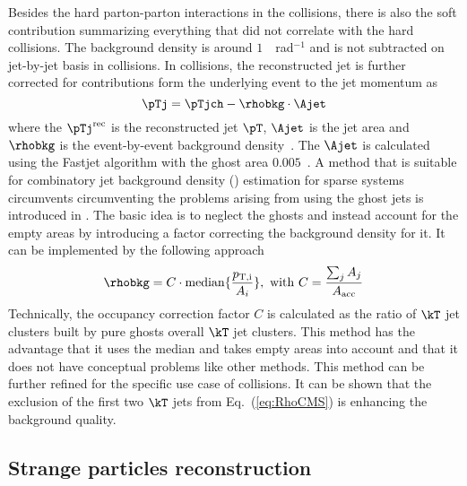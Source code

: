 \documentclass[ALICE,manyauthors]{cernphprep}
\begin{document}
Besides the hard parton-parton interactions in the collisions, there is also the soft contribution summarizing everything that did not correlate with the hard collisions.
The background density is around $1$~\GeVc~rad$^{-1}$ and is not subtracted on jet-by-jet basis in \pp collisions.
In \pPb collisions, the reconstructed jet is further corrected for contributions form the underlying event to the jet momentum as
\begin{equation}
\pTj = \pTjch - \rhobkg\cdot\Ajet
\label{eq:DeltaPt}
\end{equation}
where the $\pTj^{\rm rec}$ is the reconstructed jet $\pT$, $\Ajet$ is the jet area and $\rhobkg$ is the event-by-event background density~\cite{Cacciari:2007fd}.
The $\Ajet$ is calculated using the Fastjet algorithm with the ghost area $0.005$~\cite{Cacciari:2008gn}.
A method that is suitable for combinatory jet background density (\rhobkg) estimation for sparse systems circumvents circumventing the problems arising from using the ghost jets is introduced in \cite{Chatrchyan:2012tt}.
The basic idea is to neglect the ghosts and instead account for the empty areas by introducing a factor correcting the background density for it.
It can be implemented by the following approach
\begin{equation}
\rhobkg = C\cdot{\rm median}\{\frac{p_{\rm T,i}}{A_{i}}\},~{\rm with}~C = \frac{\sum_{j} A_{j}}{A_\mathrm{acc}}
\label{eq:RhoCMS}
\end{equation}
Technically, the occupancy correction factor $C$ is calculated as the ratio of $\kT$ jet clusters built by pure ghosts overall $\kT$ jet clusters.
This method has the advantage that it uses the median and takes empty areas into account and that it does not have conceptual problems like other methods.
This method can be further refined for the specific use case of \pPb collisions.
It can be shown that the exclusion of the first two $\kT$ jets from Eq.~(\ref{eq:RhoCMS}) is enhancing the background quality.

\subsection{Strange particles reconstruction}%
\label{sec:ParRec}
\end{document}
